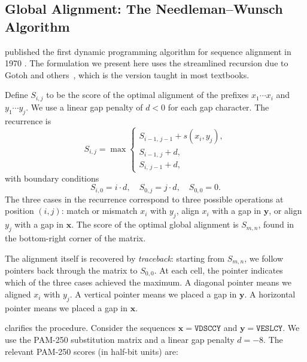 \subsection{Global Alignment: The Needleman--Wunsch Algorithm}
\label{sec:needleman-wunsch}

 published the first dynamic programming algorithm for sequence alignment in 1970 \cite{needleman1970}. The formulation we present here uses the streamlined recursion due to Gotoh and others~\cite{gotoh1982}, which is the version taught in most textbooks.

Define $S_{i,j}$ to be the score of the optimal alignment of the prefixes $x_1 \cdots x_i$ and $y_1 \cdots y_j$. We use a linear gap penalty of $d < 0$ for each gap character. The recurrence is
\begin{equation}
  \label{eq:nw-recursion}
  S_{i,j} = \max \begin{cases}
    S_{i-1,\, j-1} + s(x_i, y_j), \\
    S_{i-1,\, j} + d, \\
    S_{i,\, j-1} + d,
  \end{cases}
\end{equation}
with boundary conditions
\begin{equation}
  \label{eq:nw-boundary}
  S_{i,0} = i \cdot d, \quad S_{0,j} = j \cdot d, \quad S_{0,0} = 0.
\end{equation}
The three cases in the recurrence correspond to three possible operations at position $(i,j)$: match or mismatch $x_i$ with $y_j$, align $x_i$ with a gap in $\mathbf{y}$, or align $y_j$ with a gap in $\mathbf{x}$. The score of the optimal global alignment is $S_{m,n}$, found in the bottom-right corner of the matrix.

The alignment itself is recovered by \emph{traceback}: starting from $S_{m,n}$, we follow pointers back through the matrix to $S_{0,0}$. At each cell, the pointer indicates which of the three cases achieved the maximum. A diagonal pointer means we aligned $x_i$ with $y_j$. A vertical pointer means we placed a gap in $\mathbf{y}$. A horizontal pointer means we placed a gap in $\mathbf{x}$.

 clarifies the procedure. Consider the sequences $\mathbf{x} = \texttt{VDSCCY}$ and $\mathbf{y} = \texttt{VESLCY}$. We use the PAM-250 substitution matrix and a linear gap penalty $d = -8$. The relevant PAM-250 scores (in half-bit units) are:

